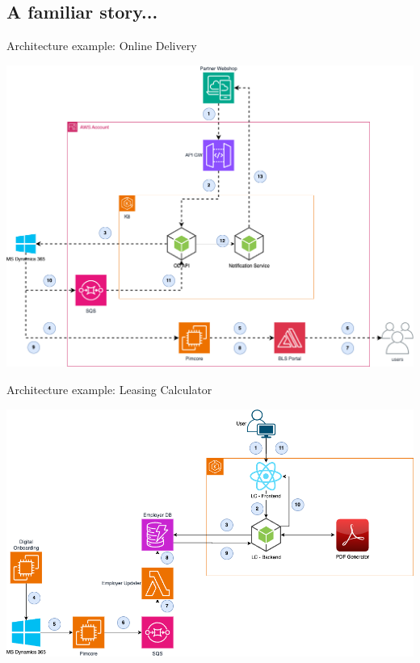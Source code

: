 \subsection{A familiar story...}
\begin{frame}{Architecture example: Online Delivery}
  \begin{center}
    \includegraphics[scale=.3]{./assets/od}
  \end{center}
\end{frame}

\begin{frame}{Architecture example: Leasing Calculator}
  \begin{center}
    \includegraphics[scale=.3]{./assets/lc}
  \end{center}
\end{frame}

